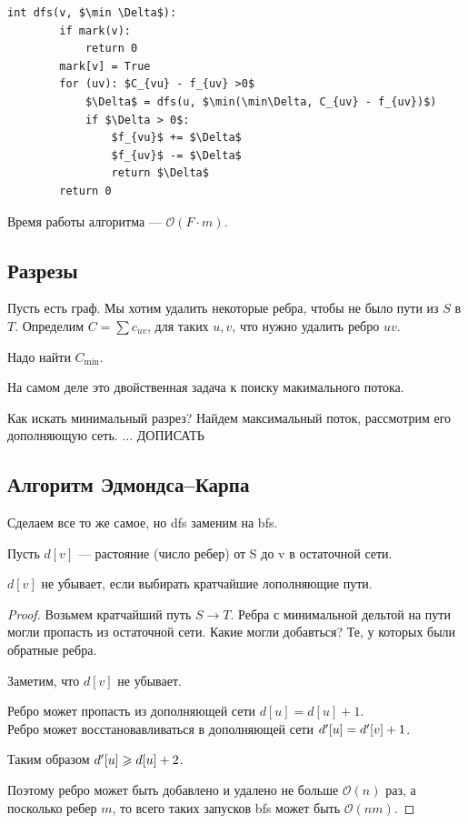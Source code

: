 \begin{lstlisting}[mathescape=true]
    int dfs(v, $\min \Delta$):
        if mark(v):
            return 0
        mark[v] = True
        for (uv): $C_{vu} - f_{uv} >0$
            $\Delta$ = dfs(u, $\min(\min\Delta, C_{uv} - f_{uv})$)
            if $\Delta > 0$:
                $f_{vu}$ += $\Delta$
                $f_{uv}$ -= $\Delta$
                return $\Delta$
        return 0
\end{lstlisting}

Время работы алгоритма --- $\mathcal{O}(F \cdot m)$.

\subsection{Разрезы}
\begin{problem}
Пусть есть граф. Мы хотим удалить некоторые ребра, чтобы не было пути из $S$ в $T$.
Определим $C = \sum c_{uv}$, для таких $u,v$, что нужно удалить ребро $uv$.

Надо найти $C_{\min}$.
\end{problem}

На самом деле это двойственная задача к поиску макимального потока.

Как искать минимальный разрез? Найдем максимальный поток, рассмотрим его дополняющую сеть. $\ldots$ ДОПИСАТЬ

\subsection{Алгоритм Эдмондса--Карпа}
Сделаем все то же самое, но dfs заменим на bfs.

Пусть $d[v]$ --- растояние (число ребер) от S до v в остаточной сети.

\begin{theorem}
    $d[v]$ не убывает, если выбирать кратчайшие лополняющие пути.
\end{theorem}
\begin{proof}
    Возьмем кратчайший путь $S \to T$. Ребра с минимальной дельтой на пути могли пропасть из остаточной сети. Какие могли добавться? Те, у которых были обратные ребра.

    Заметим, что $d[v]$ не убывает.

    Ребро может пропасть из дополняющей сети $d[u] = d[u] + 1$.\\
    Ребро может восстановавливаться в дополняющей сети $d^{\prime}[u]  = d^{\prime} [ v] + 1$.

    Таким образом $d^{\prime} [u] \geqslant d[u] + 2$.

    Поэтому ребро может быть добавлено и удалено не больше $\mathcal{O}(n)$ раз, а посколько ребер $m$, то всего таких запусков bfs может быть $\mathcal{O}(n m)$.
\end{proof}

